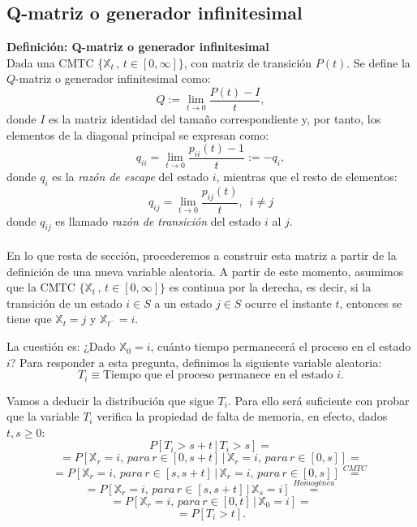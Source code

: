 \documentclass[12pt,a4paper]{article}
\begin{document}
\subsection{Q-matriz o generador infinitesimal}


\textbf{Definición: Q-matriz o generador infinitesimal}
\\
Dada una CMTC $\{\mathbb{X}_t \, , \, t\in [0,\infty]\}$, con matriz de transición $P(t)$. Se define la $Q$-matriz o generador infinitesimal como:
$$Q:=\lim_{t \to 0}\dfrac{P(t)-I}{t},$$
donde $I$ es la matriz identidad del tamaño correspondiente y, por tanto, los elementos de la diagonal principal se expresan como:
$$q_{ii}=\lim_{t \to 0}\dfrac{p_{ii}(t)-1}{t}:=-q_i,$$
donde $q_i$ es la \textit{razón de escape} del estado $i$, mientras que el resto de elementos:
$$q_{ij}=\lim_{t \to 0}\dfrac{p_{ij}(t)}{t},\,\,\, i\neq j$$
donde $q_{ij}$ es llamado \textit{razón de transición} del estado $i$ al $j$.
\\\\
En lo que resta de sección, procederemos a construir esta matriz a partir de la definición de una nueva variable aleatoria. A partir de este momento, asumimos que la CMTC $\{\mathbb{X}_t \, , \, t\in [0,\infty]\}$ es continua por la derecha, es decir, si la transición de un estado $i\in S$ a un estado $j\in S$ ocurre el instante $t$, entonces se tiene que $\mathbb{X}_t=j$ y $\mathbb{X}_{t^-}=i$.

La cuestión es: ¿Dado $\mathbb{X}_0=i$, cuánto tiempo permanecerá el proceso en el estado $i$? Para responder a esta pregunta, definimos la siguiente variable aleatoria:
$$T_i\equiv \text{Tiempo que el proceso permanece en el estado} \,\, i.$$

Vamos a deducir la distribución que sigue $T_i$. Para ello será suficiente con probar que la variable $T_i$ verifica la propiedad de falta de memoria, en efecto, dados $t,s\geq 0$:
\\
$$P[T_i>s+t\, | \,T_i>s]=$$ 
$$=P[\mathbb{X}_r=i,\, para \, r\in[0,s+t]\, | \,\mathbb{X}_r=i,\, para \, r\in[0,s]]=$$
$$=P[\mathbb{X}_r=i,\, para \, r\in[s,s+t]\, | \,\mathbb{X}_r=i,\, para \, r\in[0,s]]\overset{CMTC}{=}$$
$$=P[\mathbb{X}_r=i,\, para \, r\in[s,s+t]\, | \,\mathbb{X}_s=i]\overset{\textit{Homogénea}}{=}$$
$$=P[\mathbb{X}_r=i,\, para \, r\in[0,t]\, | \,\mathbb{X}_0=i]=$$
$$=P[T_i>t].$$
\end{document}
